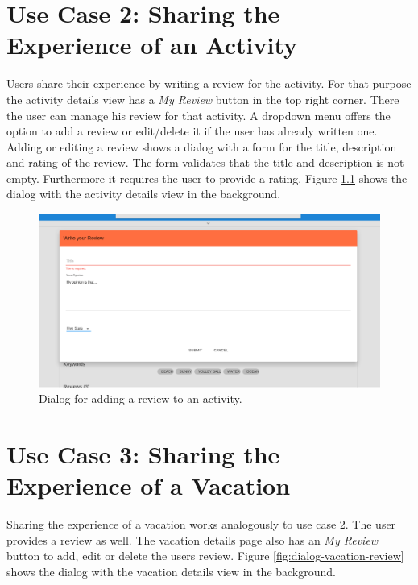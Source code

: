 \documentclass[IN,english]{tumbook}
\begin{document}
\chapter{Use Case 2: Sharing the Experience of an Activity}

Users share their experience by writing a review for the activity. For that purpose the activity details view has a \emph{My Review} button in the top right corner. There the user can manage his review for that activity. A dropdown menu offers the option to add a review or edit/delete it if the user has already written one. Adding or editing a review shows a dialog with a form for the title, description and rating of the review. The form validates that the title and description is not empty. Furthermore it requires the user to provide a rating. Figure \ref{fig:dialog-activity-review} shows the dialog with the activity details view in the background.

\begin{figure}
	\includegraphics[width=\textwidth]{pictures/review-activity}
	\caption{Dialog for adding a review to an activity.}
	\label{fig:dialog-activity-review}
\end{figure}

\chapter{Use Case 3: Sharing the Experience of a Vacation}

Sharing the experience of a vacation works analogously to use case 2. The user provides a review as well. The vacation details page also has an \emph{My Review} button to add, edit or delete the users review. Figure \ref{fig:dialog-vacation-review} shows the dialog with the vacation details view in the background.
\end{document}
